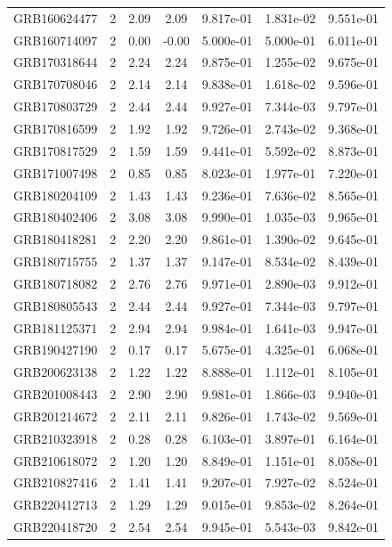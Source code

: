 \documentclass[12pt]{article}
\begin{document}
\begin{table}[h!]
{\begin{tabular}{l c c c c c c}
GRB160624477 & 2 & 2.09 & 2.09 & 9.817e-01 & 1.831e-02 & 9.551e-01 \\
GRB160714097 & 2 & 0.00 & -0.00 & 5.000e-01 & 5.000e-01 & 6.011e-01 \\
GRB170318644 & 2 & 2.24 & 2.24 & 9.875e-01 & 1.255e-02 & 9.675e-01 \\
GRB170708046 & 2 & 2.14 & 2.14 & 9.838e-01 & 1.618e-02 & 9.596e-01 \\
GRB170803729 & 2 & 2.44 & 2.44 & 9.927e-01 & 7.344e-03 & 9.797e-01 \\
GRB170816599 & 2 & 1.92 & 1.92 & 9.726e-01 & 2.743e-02 & 9.368e-01 \\
GRB170817529 & 2 & 1.59 & 1.59 & 9.441e-01 & 5.592e-02 & 8.873e-01 \\
GRB171007498 & 2 & 0.85 & 0.85 & 8.023e-01 & 1.977e-01 & 7.220e-01 \\
GRB180204109 & 2 & 1.43 & 1.43 & 9.236e-01 & 7.636e-02 & 8.565e-01 \\
GRB180402406 & 2 & 3.08 & 3.08 & 9.990e-01 & 1.035e-03 & 9.965e-01 \\
GRB180418281 & 2 & 2.20 & 2.20 & 9.861e-01 & 1.390e-02 & 9.645e-01 \\
GRB180715755 & 2 & 1.37 & 1.37 & 9.147e-01 & 8.534e-02 & 8.439e-01 \\
GRB180718082 & 2 & 2.76 & 2.76 & 9.971e-01 & 2.890e-03 & 9.912e-01 \\
GRB180805543 & 2 & 2.44 & 2.44 & 9.927e-01 & 7.344e-03 & 9.797e-01 \\
GRB181125371 & 2 & 2.94 & 2.94 & 9.984e-01 & 1.641e-03 & 9.947e-01 \\
GRB190427190 & 2 & 0.17 & 0.17 & 5.675e-01 & 4.325e-01 & 6.068e-01 \\
GRB200623138 & 2 & 1.22 & 1.22 & 8.888e-01 & 1.112e-01 & 8.105e-01 \\
GRB201008443 & 2 & 2.90 & 2.90 & 9.981e-01 & 1.866e-03 & 9.940e-01 \\
GRB201214672 & 2 & 2.11 & 2.11 & 9.826e-01 & 1.743e-02 & 9.569e-01 \\
GRB210323918 & 2 & 0.28 & 0.28 & 6.103e-01 & 3.897e-01 & 6.164e-01 \\
GRB210618072 & 2 & 1.20 & 1.20 & 8.849e-01 & 1.151e-01 & 8.058e-01 \\
GRB210827416 & 2 & 1.41 & 1.41 & 9.207e-01 & 7.927e-02 & 8.524e-01 \\
GRB220412713 & 2 & 1.29 & 1.29 & 9.015e-01 & 9.853e-02 & 8.264e-01 \\
GRB220418720 & 2 & 2.54 & 2.54 & 9.945e-01 & 5.543e-03 & 9.842e-01 \\

\end{tabular}}
\end{table}
\end{document}
